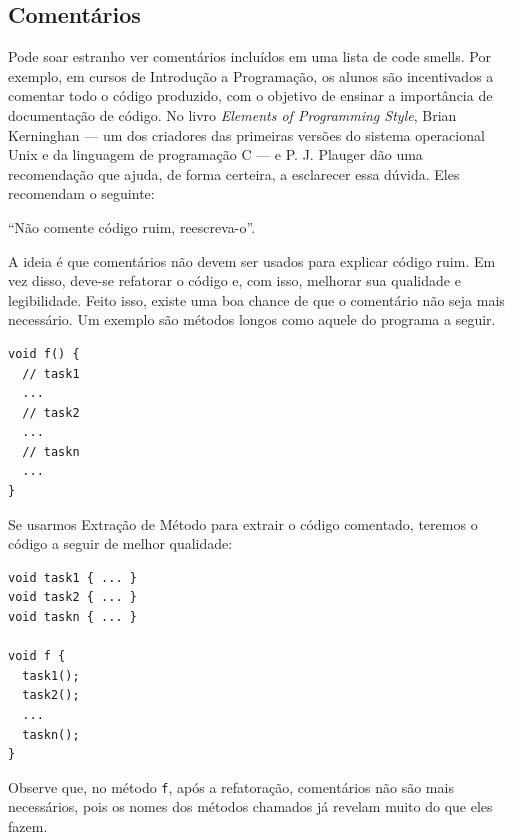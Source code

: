 \documentclass[
  11pt,
  twoside]{book}
\newcommand{\passthrough}[1]{#1}
\renewenvironment{quote}{\centering \vspace{1.5ex} \begin{tcolorbox}[colback=backcolor, width=4.9in]}{\end{tcolorbox}}
\begin{document}
\hypertarget{comentuxe1rios}{%
\subsection{Comentários}\label{comentuxe1rios}}

 

Pode soar estranho ver comentários incluídos em uma lista de code
smells. Por exemplo, em cursos de Introdução a Programação, os alunos
são incentivados a comentar todo o código produzido, com o objetivo de
ensinar a importância de documentação de código. No livro \emph{Elements
of Programming Style}, Brian Kerninghan --- um dos criadores das
primeiras versões do sistema operacional Unix e da linguagem de
programação C --- e P. J. Plauger dão uma recomendação que ajuda, de
forma certeira, a esclarecer essa dúvida. Eles recomendam o seguinte:

\begin{quote}
``Não comente código ruim, reescreva-o''.
\end{quote}

A ideia é que comentários não devem ser usados para explicar código
ruim. Em vez disso, deve-se refatorar o código e, com isso, melhorar sua
qualidade e legibilidade. Feito isso, existe uma boa chance de que o
comentário não seja mais necessário. Um exemplo são métodos longos como
aquele do programa a seguir.

\begin{lstlisting}
void f() {
  // task1
  ... 
  // task2
  ... 
  // taskn
  ...
}
\end{lstlisting}

Se usarmos Extração de Método para extrair o código comentado, teremos o
código a seguir de melhor qualidade:

\begin{lstlisting}
void task1 { ... }
void task2 { ... }
void taskn { ... }

void f { 
  task1();
  task2();
  ...
  taskn();
}
\end{lstlisting}

Observe que, no método \passthrough{\lstinline!f!}, após a refatoração,
comentários não são mais necessários, pois os nomes dos métodos chamados
já revelam muito do que eles fazem.

\end{document}
